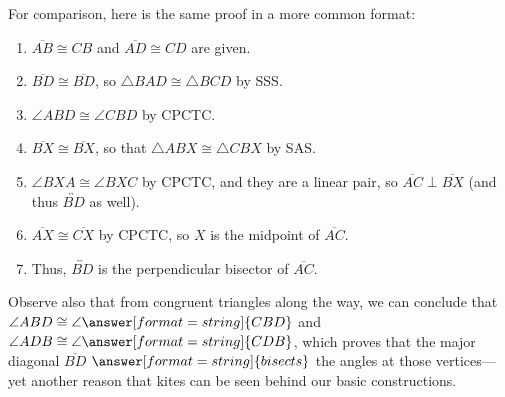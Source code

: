 \documentclass[nooutcomes]{ximera}
\begin{document}
\begin{problem}
\begin{problem}
For comparison, here is the same proof in a more common format:
\begin{enumerate}
\item $\overline{AB}\cong CB$ and $\overline{AD}\cong CD$ are given.  
\item $\overline{BD}\cong \overline{BD}$, so $\triangle BAD \cong \triangle BCD$ by SSS.  
\item $\angle ABD \cong \angle CBD$ by CPCTC. 
\item $\overline{BX}\cong \overline{BX}$, so that $\triangle ABX \cong \triangle CBX$ by SAS.  
\item $\angle BXA \cong \angle BXC$ by CPCTC, and they are a linear pair, 
so $\overline{AC}\perp\overline{BX}$ (and thus $\overleftrightarrow{BD}$ as well). 
\item $\overline{AX}\cong \overline{CX}$ by CPCTC, so $X$ is the midpoint of $\overline{AC}$.
\item Thus, $\overleftrightarrow{BD}$ is the perpendicular bisector of $\overline{AC}$.
\end{enumerate}

Observe also that from congruent triangles along the way, we can conclude that 
$\angle ABD\cong \angle \answer[format=string]{CBD}$ and $\angle ADB \cong \angle \answer[format=string]{CDB}$, 
which proves that the major diagonal $\overline{BD}$ $\answer[format=string]{bisects}$ the angles at those vertices---yet 
another reason that kites can be seen behind our basic constructions.  

\end{problem}

\end{problem}
\end{document}
